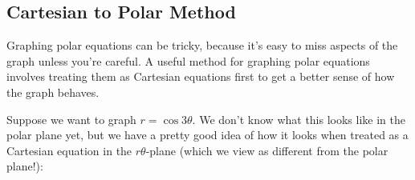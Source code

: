 \documentclass[10pt,]{book}
\theoremstyle{ptxplainnotitle}
\theoremstyle{ptxplaintitle}
\theoremstyle{ptxplainnotitle}
\theoremstyle{ptxplaintitle}
\theoremstyle{ptxplainnotitle}
\theoremstyle{ptxplaintitle}
\theoremstyle{ptxdefinitionnotitle}
\theoremstyle{ptxdefinitiontitle}
\theoremstyle{ptxdefinitionnotitle}
\theoremstyle{ptxdefinitiontitle}
\theoremstyle{ptxdefinitionnotitle}
\theoremstyle{ptxdefinitiontitle}
\theoremstyle{ptxdefinitionnotitle}
\theoremstyle{ptxdefinitiontitle}
\theoremstyle{ptxdefinitionnotitle}
\theoremstyle{ptxdefinitiontitle}
\numberwithin{equation}{section}
\begin{document}
\subsection[{Cartesian to Polar Method}]{Cartesian to Polar Method}\label{subsection-cartesian-to-polar-method}
\hypertarget{p-689}{}%
Graphing polar equations can be tricky, because it's easy to miss aspects of the graph unless you're careful. A useful method for graphing polar equations involves treating them as Cartesian equations first to get a better sense of how the graph behaves.%
\begin{example}\label{example-three-leaf-rose}
\hypertarget{p-690}{}%
Suppose we want to graph \(r = \cos3\theta\). We don't know what this looks like in the polar plane yet, but we have a pretty good idea of how it looks when treated as a Cartesian equation in the \(r\theta\)-plane (which we view as different from the polar plane!):%
\begin{figure}
\centering
{
}
\end{figure}
\end{example}
\end{document}
